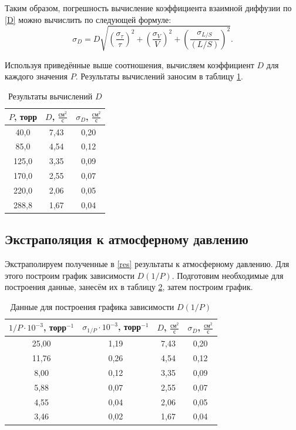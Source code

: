 \documentclass[a4paper,12pt]{article} %
\begin{document}
Таким образом, погрешность вычисление коэффициента взаимной диффузии по \eqref{D} можно вычислить по следующей формуле:
\[ \sigma_D = D\sqrt{\left(\frac{\sigma_\tau}{\tau}\right)^2+\left(\frac{\sigma_V}{V}\right)^2+\left(\frac{\sigma_{L/S}}{(L/S)}\right)^2}. \]

Используя приведённые выше соотношения, вычисляем коэффициент $ D $ для каждого значения $ P $. Результаты вычислений заносим в таблицу \ref{tab:Dres}.

\begin{table}[H]
	\centering
	\begin{tabular}{|c|c|c|}
		\hline
		$ P $, торр & $ D $, $ \frac{\text{см}^2}{\text{с}} $ & $ \sigma_D $, $ \frac{\text{см}^2}{\text{с}} $ \\ \hline
		40,0 & 7,43 & 0,20 \\ \hline
		85,0 & 4,54 & 0,12 \\ \hline
		125,0 & 3,35 & 0,09 \\ \hline
		170,0 & 2,55 & 0,07 \\ \hline
		220,0 & 2,06 & 0,05 \\ \hline
		288,8 & 1,67 & 0,04 \\ \hline
	\end{tabular}
	\caption{Результаты вычислений $D$}
	\label{tab:Dres}
\end{table}

\label{res}

\subsection{Экстраполяция к атмосферному давлению}

Экстраполируем полученные в \ref{res} результаты к атмосферному давлению. Для этого построим график зависимости $ D(1/P) $. Подготовим необходимые для построения данные, занесём их в таблицу \ref{tab:data}, затем построим график.

\begin{table}[H]
	\centering
	\begin{tabular}{|c|c|c|c|}
		\hline
		$ 1/P \cdot 10^{-3} $, торр$ ^{-1} $  & $ \sigma_{1/P} \cdot 10^{-3} $, торр$ ^{-1} $ & $ D $, $ \frac{\text{см}^2}{\text{с}} $ & $ \sigma_D $, $ \frac{\text{см}^2}{\text{с}} $ \\ \hline
		25,00 & 1,19 & 7,43 & 0,20 \\ \hline
		11,76 & 0,26 & 4,54 & 0,12 \\ \hline
		8,00 & 0,12 & 3,35 & 0,09 \\ \hline
		5,88 & 0,07 & 2,55 & 0,07 \\ \hline
		4,55 & 0,04 & 2,06 & 0,05 \\ \hline
		3,46 & 0,02 & 1,67 & 0,04 \\ \hline
	\end{tabular}
	\caption{Данные для построения графика зависимости $D(1/P)$}
	\label{tab:data}
\end{table}
\end{document}

